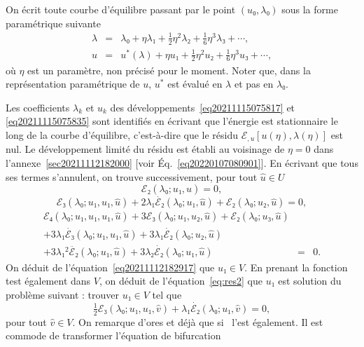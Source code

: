 \documentclass{article}
\begin{document}
On écrit toute courbe d'équilibre passant par le point $(u₀,
λ₀)$ sous la forme paramétrique suivante
\begin{eqnarray}
  λ & = & λ₀ + η λ₁ + \tfrac{1}{2} η^2 λ₂ +
  \tfrac{1}{6} η^3 λ₃ + \cdots,  \label{eq20211115075817}\\
  u & = & u^{\ast} (λ) + η u₁ + \tfrac{1}{2} η^2 u₂ +
  \tfrac{1}{6} η^3 u₃ + \cdots,  \label{eq20211115075835}
\end{eqnarray}
où $η$ est un paramètre, non précisé pour le moment. Noter
que, dans la représentation paramétrique de $u$, $u^{\ast}$ est
évalué en $λ$ et pas en $λ₀$.

Les coefficients $λ_k$ et $u_k$ des
développements~\eqref{eq20211115075817} et \eqref{eq20211115075835} sont
identifiés en écrivant que l'énergie est stationnaire le long de
la courbe d'équilibre, c'est-à-dire que le résidu $ℰ_{,
u}  [u (η), λ (η)]$ est nul. Le développement limité du
résidu est établi au voisinage de $η = 0$ dans
l'annexe~\ref{sec20211112182000} [voir Éq.~\eqref{eq20220107080901}]. En
écrivant que tous ses termes s'annulent, on trouve successivement, pour
tout $\hat{u}∈U$
\begin{equation}
  \label{eq20211112182917} ℰ₂ (λ₀ ; u₁, \hat{u}) = 0,
\end{equation}
\begin{equation}
  \label{eq:res2} ℰ₃ (λ₀ ; u₁, u₁, \hat{u}) + 2 λ₁
  \dot{ℰ₂} (λ₀ ; u₁, \hat{u}) +ℰ₂ (λ₀ ;
  u₂, \hat{u}) = 0,
\end{equation}
\begin{eqnarray}
  ℰ₄ (λ₀ ; u₁, u₁, u₁, \hat{u}) + 3ℰ₃
  (λ₀ ; u₁, u₂, \hat{u}) +ℰ₂ (λ₀ ; u₃, \hat{u}) &
  &  \nonumber\\
  + 3 λ₁  \dot{ℰ₃} (λ₀ ; u₁, u₁, \hat{u}) + 3
  λ₁  \dot{ℰ₂} (λ₀ ; u₂, \hat{u}) &  &  \nonumber\\
  + 3 λ₁^2  \ddot{ℰ₂} (λ₀ ; u₁, \hat{u}) + 3
  λ₂  \dot{ℰ₂} (λ₀ ; u₁, \hat{u}) & = & 0.
  \label{eq:res3}
\end{eqnarray}
On déduit de l'équation~\eqref{eq20211112182917} que $u₁∈V$. En
prenant la fonction test également dans $V$, on déduit de
l'équation~\eqref{eq:res2} que $u₁$ est solution du problème suivant
: trouver $u₁∈V$ tel que
\begin{equation}
  \label{eq:bifurcation 1a} \tfrac{1}{2} ℰ₃ (λ₀ ; u₁, u₁,
  \hat{v}) + λ₁  \dot{ℰ₂} (λ₀ ; u₁, \hat{v}) = 0,
\end{equation}
pour tout $\hat{v}∈V$. On remarque d'ores et déjà que si \ l'est
également. Il est commode de transformer l'équation de bifurcation
\end{document}
